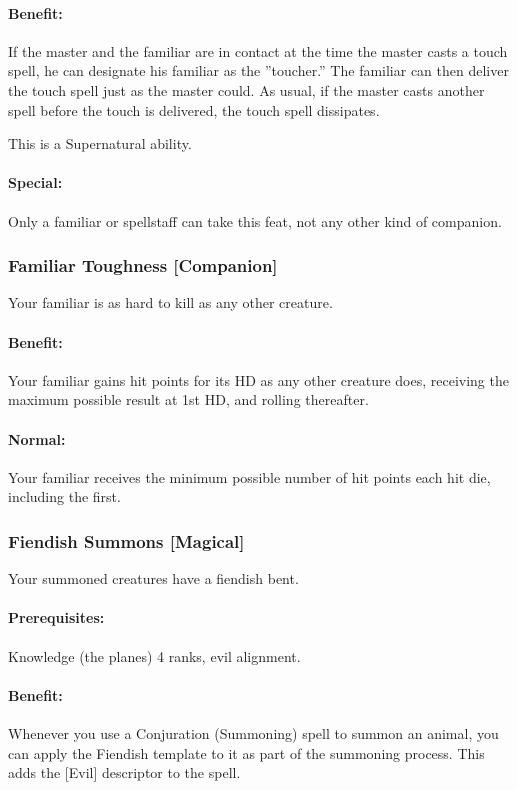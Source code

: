 \paragraph{Benefit:} If the master and the familiar are in contact at the time the master casts a touch spell, he can designate his familiar as the ''toucher.'' 
The familiar can then deliver the touch spell just as the master could. 
As usual, if the master casts another spell before the touch is delivered, the touch spell dissipates. 

This is a Supernatural ability.

\paragraph{Special:} Only a familiar or spellstaff can take this feat, not any other kind of companion.
\subsubsection[Familiar Toughness]{Familiar Toughness [Companion]}
\label{Feat:FamiliarToughness}
Your familiar is as hard to kill as any other creature.

\paragraph{Benefit:} Your familiar gains hit points for its HD as any other creature does, receiving the maximum possible result at 1st HD, and rolling thereafter.

\paragraph{Normal:} Your familiar receives the minimum possible number of hit points each hit die, including the first.
\subsubsection[Fiendish Summons]{Fiendish Summons [Magical]}
\label{Feat:FiendishSummons}
Your summoned creatures have a fiendish bent.

\paragraph{Prerequisites:} Knowledge (the planes) 4 ranks, evil alignment.

\paragraph{Benefit:} Whenever you use a Conjuration (Summoning) spell to summon an animal, you can apply the Fiendish template to it as part of the summoning process. This adds the [Evil] descriptor to the spell.
